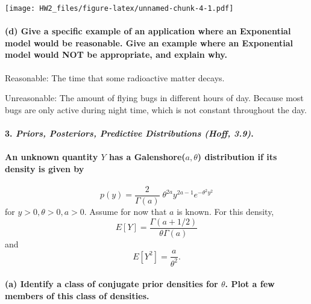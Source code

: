 \documentclass[]{article}
\let\oldparagraph\paragraph
\renewcommand{\paragraph}[1]{\oldparagraph{#1}\mbox{}}
\begin{document}
\texttt{[image: HW2\_files/figure-latex/unnamed-chunk-4-1.pdf]}

\paragraph{(d) Give a specific example of an application where an
Exponential model would be reasonable. Give an example where an
Exponential model would NOT be appropriate, and explain
why.}\label{d-give-a-specific-example-of-an-application-where-an-exponential-model-would-be-reasonable.-give-an-example-where-an-exponential-model-would-not-be-appropriate-and-explain-why.}

Reasonable: The time that some radioactive matter decays.

Unreasonable: The amount of flying bugs in different hours of day.
Because most bugs are only active during night time, which is not
constant throughout the day.

\paragraph{\texorpdfstring{3. \textbf{\emph{Priors, Posteriors,
Predictive Distributions (Hoff,
3.9)}}.}{3. Priors, Posteriors, Predictive Distributions (Hoff, 3.9).}}\label{priors-posteriors-predictive-distributions-hoff-3.9.}

\paragraph{\texorpdfstring{An unknown quantity \(Y\) has a
Galenshore(\(a, \theta\)) distribution if its density is given
by}{An unknown quantity Y has a Galenshore(a, \textbackslash{}theta) distribution if its density is given by}}\label{an-unknown-quantity-y-has-a-galenshorea-theta-distribution-if-its-density-is-given-by}

\[p(y) = \frac{2}{\Gamma(a)} \; \theta^{2a} y^{2a - 1} e^{-\theta^2 y^2}\]
for \(y>0, \theta >0, a>0.\) Assume for now that \(a\) is known. For
this density, \[E[Y] = \frac{\Gamma(a +1/2)}{\theta \Gamma(a)}\] and
\[E[Y^2] = \frac{a}{\theta^2}.\]

\paragraph{\texorpdfstring{(a) Identify a class of conjugate prior
densities for \(\theta\). Plot a few members of this class of
densities.}{(a) Identify a class of conjugate prior densities for \textbackslash{}theta. Plot a few members of this class of densities.}}\label{a-identify-a-class-of-conjugate-prior-densities-for-theta.-plot-a-few-members-of-this-class-of-densities.}
\end{document}
